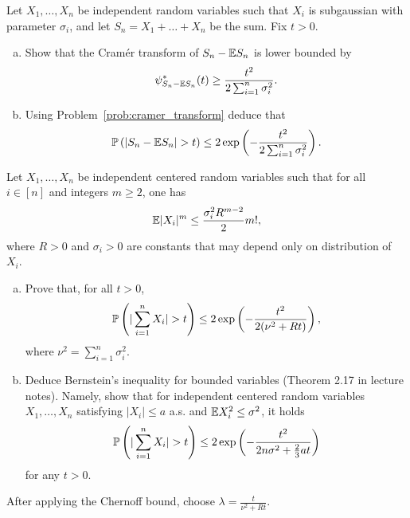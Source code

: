 \begin{myexercise}
    \label{prob:hoeffding_subg}
    Let $X_1, \ldots, X_n$ be independent random variables such that $X_i$ is subgaussian with parameter $\sigma_i$, and let $S_n = X_1 + \ldots + X_n$ be the sum. Fix $t > 0$.
    \begin{enumerate}[(a)]
        \item Show that the Cramér transform of $S_n - \mathbb{E} S_n$ is lower bounded by
        \begin{equation*}
            \psi_{S_n - \mathbb{E} S_n}^*(t) \geq \frac{t^2}{2 \sum_{i=1}^n \sigma_i^2}.
        \end{equation*}
        \item Using Problem~\ref{prob:cramer_transform} deduce that
        \begin{equation*}
            \mathbb{P}\left( |S_n - \mathbb{E} S_n| > t \right) \leq 2\exp\left( -\frac{t^2}{2\sum_{i=1}^n \sigma_i^2} \right).
        \end{equation*}
    \end{enumerate}
\end{myexercise}

\begin{myexercise}
    \label{prob:bernstein_moments}
    Let $X_1, \dots, X_n$ be independent centered random variables such that for all $i \in [n]$ and integers $m \geq 2$, one has
    \begin{equation*}
        \mathbb{E}|X_i|^m \leq \frac{\sigma_i^2 R^{m-2}}{2} m!,
    \end{equation*}
    where $R>0$ and $\sigma_i>0$ are constants that may depend only on distribution of $X_i$. 
    \begin{enumerate}[(a)]
        \item Prove that, for all $t > 0$, 
        \begin{equation*}
            \mathbb{P}\left( | \sum_{i=1}^n X_i| > t \right) \leq 2 \exp \left(  - \frac{t^2}{2(\nu^2 + Rt)} \right),
        \end{equation*}
        where $\nu^2 = \sum_{i=1}^n \sigma_i^2$.
        
        \item Deduce Bernstein's inequality for bounded variables (Theorem 2.17 in lecture notes). Namely, show that for independent centered random variables $X_1, \dots, X_n$ satisfying $|X_i|\le a$ a.s. and $\mathbb{E} X_i^2 \le \sigma^2$, it holds
        \begin{equation*}
            \mathbb{P}\left( | \sum_{i=1}^n X_i| > t \right) \leq 2 \exp \left(  -\frac{t^2}{2n\sigma^2 + \frac{2}{3} at} \right)
        \end{equation*}
        for any $t > 0$.
    \end{enumerate}
\end{myexercise}
\begin{hint}
    After applying the Chernoff bound, choose $\lambda = \frac{t}{\nu^2 + Rt}$.
\end{hint}

